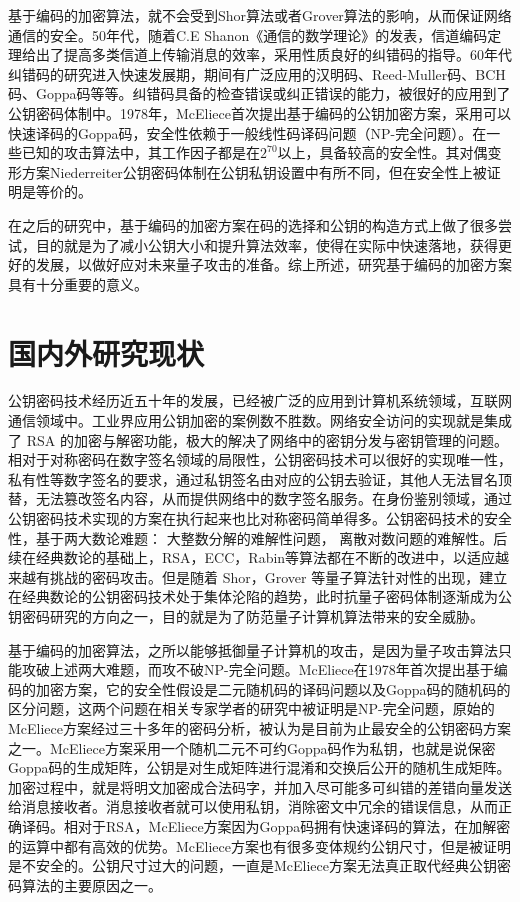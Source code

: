 基于编码的加密算法，就不会受到Shor算法或者Grover算法的影响，从而保证网络通信的安全\cite{Overbeck2009Code}。50年代，随着C.E Shanon《通信的数学理论》的发表，信道编码定理给出了提高多类信道上传输消息的效率，采用性质良好的纠错码的指导。60年代纠错码的研究进入快速发展期，期间有广泛应用的汉明码、Reed-Muller码\cite{Karpunin2004On}、BCH码\cite{Faug2016Structural}、Goppa码\cite{Macwilliams1977The}等等。纠错码具备的检查错误或纠正错误的能力，被很好的应用到了公钥密码体制中。1978年，McEliece首次提出基于编码的公钥加密方案，采用可以快速译码的Goppa码，安全性依赖于一般线性码译码问题（NP-完全问题）。在一些已知的攻击算法中，其工作因子都是在$2 ^ {70}$以上，具备较高的安全性。其对偶变形方案Niederreiter公钥密码体制在公钥私钥设置中有所不同，但在安全性上被证明是等价的。

在之后的研究中，基于编码的加密方案在码的选择和公钥的构造方式上做了很多尝试，目的就是为了减小公钥大小和提升算法效率，使得在实际中快速落地，获得更好的发展，以做好应对未来量子攻击的准备。综上所述，研究基于编码的加密方案具有十分重要的意义。

\section{国内外研究现状}
公钥密码技术经历近五十年的发展，已经被广泛的应用到计算机系统领域，互联网通信领域中\cite{郑东2013密码学综述}。工业界应用公钥加密的案例数不胜数。网络安全访问的实现就是集成了 RSA 的加密与解密功能，极大的解决了网络中的密钥分发与密钥管理的问题。相对于对称密码在数字签名领域的局限性，公钥密码技术可以很好的实现唯一性，私有性等数字签名的要求，通过私钥签名由对应的公钥去验证，其他人无法冒名顶替，无法篡改签名内容，从而提供网络中的数字签名服务。在身份鉴别领域，通过公钥密码技术实现的方案在执行起来也比对称密码简单得多。公钥密码技术的安全性，基于两大数论难题： 大整数分解的难解性问题， 离散对数问题的难解性。后续在经典数论的基础上，RSA，ECC，Rabin等算法都在不断的改进中，以适应越来越有挑战的密码攻击。但是随着 Shor，Grover 等量子算法针对性的出现，建立在经典数论的公钥密码技术处于集体沦陷的趋势，此时抗量子密码体制逐渐成为公钥密码研究的方向之一，目的就是为了防范量子计算机算法带来的安全威胁。

基于编码的加密算法，之所以能够抵御量子计算机的攻击，是因为量子攻击算法只能攻破上述两大难题，而攻不破{NP-}完全问题。McEliece在1978年首次提出基于编码的加密方案，它的安全性假设是二元随机码的译码问题\cite{Berlekamp1978On}以及Goppa码的随机码的区分问题\cite{Engelbert2007A}，这两个问题在相关专家学者的研究中被证明是{NP-}完全问题，原始的McEliece方案经过三十多年的密码分析，被认为是目前为止最安全的公钥密码方案之一。McEliece方案采用一个随机二元不可约Goppa码作为私钥，也就是说保密Goppa码的生成矩阵，公钥是对生成矩阵进行混淆和交换后公开的随机生成矩阵。加密过程中，就是将明文加密成合法码字，并加入尽可能多可纠错的差错向量发送给消息接收者。消息接收者就可以使用私钥，消除密文中冗余的错误信息，从而正确译码。相对于RSA，McEliece方案因为Goppa码拥有快速译码的算法，在加解密的运算中都有高效的优势。McEliece方案也有很多变体规约公钥尺寸，但是被证明是不安全的\cite{Landais2013An, Bernstein2008Attacking}。公钥尺寸过大的问题，一直是McEliece方案无法真正取代经典公钥密码算法的主要原因之一。

